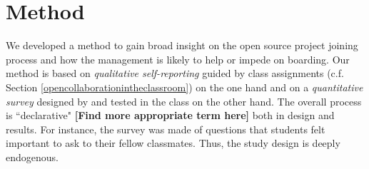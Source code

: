 \section{Method}
We developed a method to gain broad insight on the open source project joining process and how the management is likely to help or impede on boarding. Our method is based on {\it qualitative self-reporting} guided by class assignments (c.f. Section \ref{opencollaborationintheclassroom}) on the one hand and on a {\it quantitative survey} designed by and tested in the class on the other hand. The overall process is ``declarative" {\bf [Find more appropriate term here]} both in design and results. For instance, the survey was made of questions that students felt important to ask to their fellow classmates. Thus, the study design is deeply endogenous.

